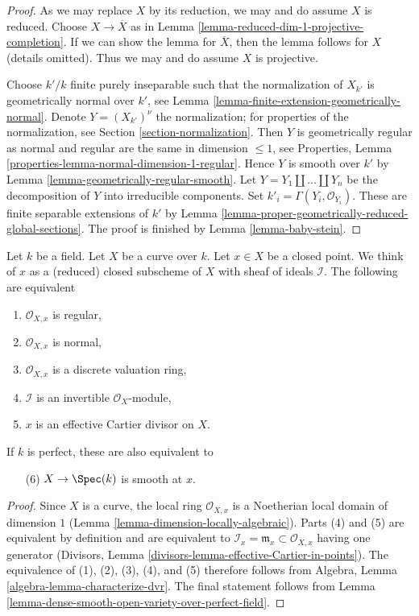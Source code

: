 \begin{proof}
As we may replace $X$ by its reduction, we may and do assume $X$ is reduced.
Choose $X \to \overline{X}$ as in
Lemma \ref{lemma-reduced-dim-1-projective-completion}.
If we can show the lemma for $\overline{X}$, then the lemma follows
for $X$ (details omitted).
Thus we may and do assume $X$ is projective.

\medskip\noindent
Choose $k'/k$ finite purely inseparable such that the normalization of
$X_{k'}$ is geometrically normal over $k'$, see
Lemma \ref{lemma-finite-extension-geometrically-normal}.
Denote $Y = (X_{k'})^\nu$ the normalization; for properties
of the normalization, see Section \ref{section-normalization}.
Then $Y$ is geometrically regular as normal and regular are the same
in dimension $\leq 1$, see
Properties, Lemma \ref{properties-lemma-normal-dimension-1-regular}.
Hence $Y$ is smooth over $k'$ by
Lemma \ref{lemma-geometrically-regular-smooth}.
Let $Y = Y_1 \amalg \ldots \amalg Y_n$ be the decomposition
of $Y$ into irreducible components.
Set $k'_i = \Gamma(Y_i, \mathcal{O}_{Y_i})$.
These are finite separable extensions of $k'$ by
Lemma \ref{lemma-proper-geometrically-reduced-global-sections}.
The proof is finished by Lemma \ref{lemma-baby-stein}.
\end{proof}

\begin{lemma}
\label{lemma-regular-point-on-curve}
Let $k$ be a field. Let $X$ be a curve over $k$. Let $x \in X$ be a closed
point. We think of $x$ as a (reduced) closed subscheme of $X$ with sheaf
of ideals $\mathcal{I}$. The following are equivalent
\begin{enumerate}
\item $\mathcal{O}_{X, x}$ is regular,
\item $\mathcal{O}_{X, x}$ is normal,
\item $\mathcal{O}_{X, x}$ is a discrete valuation ring,
\item $\mathcal{I}$ is an invertible $\mathcal{O}_X$-module,
\item $x$ is an effective Cartier divisor on $X$.
\end{enumerate}
If $k$ is perfect, these are also equivalent to
\begin{enumerate}
\item[(6)] $X \to \Spec(k)$ is smooth at $x$.
\end{enumerate}
\end{lemma}

\begin{proof}
Since $X$ is a curve, the local ring $\mathcal{O}_{X, x}$ is a Noetherian
local domain of dimension $1$ (Lemma \ref{lemma-dimension-locally-algebraic}).
Parts (4) and (5) are equivalent by definition and are equivalent to
$\mathcal{I}_x = \mathfrak m_x \subset \mathcal{O}_{X, x}$ having one generator
(Divisors, Lemma \ref{divisors-lemma-effective-Cartier-in-points}).
The equivalence of (1), (2), (3), (4), and (5) therefore follows from
Algebra, Lemma \ref{algebra-lemma-characterize-dvr}. The final statement
follows from Lemma \ref{lemma-dense-smooth-open-variety-over-perfect-field}.
\end{proof}

